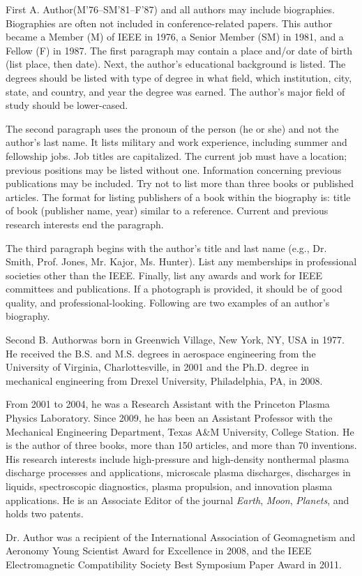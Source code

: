 \documentclass[journal]{IEEEtai}
\begin{document}
\begin{IEEEbiography}{First A. Author}{\space}(M'76--SM'81--F'87) and all authors may include biographies. Biographies are often not included in conference-related papers. This author became a Member (M) of IEEE in 1976, a Senior Member (SM) in 1981, and a Fellow (F) in 1987. The first paragraph may contain a place and/or date of birth (list place, then date). Next, the author’s educational background is listed. The degrees should be listed with type of degree in what field, which institution, city, state, and country, and year the degree was earned. The author's major field of study should be lower-cased.

The second paragraph uses the pronoun of the person (he or she) and not the author's last name. It lists military and work experience, including summer and fellowship jobs. Job titles are capitalized. The current job must have a location; previous positions may be listed without one. Information concerning previous publications may be included. Try not to list more than three books or published articles. The format for listing publishers of a book within the biography is: title of book (publisher name, year) similar to a reference. Current and previous research interests end the paragraph.

The third paragraph begins with the author's title and last name (e.g., Dr. Smith, Prof. Jones, Mr. Kajor, Ms. Hunter). List any memberships in professional societies other than the IEEE. Finally, list any awards and work for IEEE committees and publications. If a photograph is provided, it should be of good quality, and professional-looking. Following are two examples of an author’s biography.
\end{IEEEbiography}

\begin{IEEEbiography}{Second B. Author}{\space}was born in Greenwich Village, New York, NY, USA in 1977. He received the B.S. and M.S. degrees in aerospace engineering from the University of Virginia, Charlottesville, in 2001 and the Ph.D. degree in mechanical engineering from Drexel University, Philadelphia, PA, in 2008.

    From 2001 to 2004, he was a Research Assistant with the Princeton Plasma Physics Laboratory. Since 2009, he has been an Assistant Professor with the Mechanical Engineering Department, Texas A\&M University, College Station. He is the author of three books, more than 150 articles, and more than 70 inventions. His research interests include high-pressure and high-density nonthermal plasma discharge processes and applications, microscale plasma discharges, discharges in liquids, spectroscopic diagnostics, plasma propulsion, and innovation plasma applications. He is an Associate Editor of the journal {\it Earth}, {\it Moon}, {\it Planets}, and holds two patents. 

   Dr. Author was a recipient of the International Association of Geomagnetism and Aeronomy Young Scientist Award for Excellence in 2008, and the IEEE Electromagnetic Compatibility Society Best Symposium Paper Award in 2011. 
\end{IEEEbiography}
\end{document}
